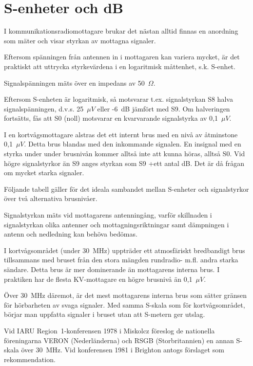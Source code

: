 \chapter{S-enheter och dB}
\label{s-enhet}

I kommunikationsradiomottagare brukar det nästan alltid finnas en
anordning som mäter och visar styrkan av mottagna signaler.

Eftersom spänningen från antennen in i mottagaren kan variera mycket,
är det praktiskt att uttrycka styrkevärdena i en logaritmisk måttenhet,
s.k. S-enhet.

Signalspänningen mäts över en impedans av 50~\(\Omega\).

Eftersom S-enheten är logaritmisk, så motsvarar t.ex. signalstyrkan
S8 halva signalspänningen, d.v.s. 25~\(\mu V\) eller -6~dB jämfört med S9. Om
halveringen fortsätts, fås att S0 (noll) motsvarar en kvarvarande
signalstyrka av 0,1~\(\mu V\).

I en kortvågsmottagare alstras det ett internt brus med en nivå av
åtminstone 0,1~\(\mu V\).  Detta brus blandas med den inkommande signalen. En
insignal med en styrka under under brusnivån kommer alltså inte att
kunna höras, alltså S0. Vid högre signalstyrkor än S9 anges styrkan
som S9 +ett antal dB. Det är då frågan om mycket starka signaler.

Följande tabell gäller för det ideala sambandet mellan S-enheter och
signalstyrkor över två alternativa brusnivåer.

Signalstyrkan mäts vid mottagarens antenningång, varför skillnaden i
signalstyrkan olika antenner och mottagningsriktningar samt dämpningen
i antenn och nedledning kan behöva bedömas.

I kortvågsområdet (under 30~MHz) uppträder ett atmosfäriskt
bredbandigt brus tillsammans med bruset från den stora mängden
rundradio- m.fl. andra starka sändare. Detta brus är mer dominerande
än mottagarens interna brus. I praktiken har de flesta KV-mottagare en
högre brusnivå än 0,1~\(\mu V\).

Över 30~MHz däremot, är det mest mottagarens interna brus som sätter
gränsen för hörbarheten av svaga signaler. Med samma S-skala som för
kortvågsområdet, börjar man uppfatta signaler i bruset utan att
S-metern ger utslag.

Vid IARU Region~1-konferensen 1978 i Miskolcz föreslog de nationella
föreningarna VERON (Nederländerna) och RSGB (Storbritannien) en annan
S-skala över 30~MHz.  Vid konferensen 1981 i Brighton antogs förslaget
som rekommendation.

